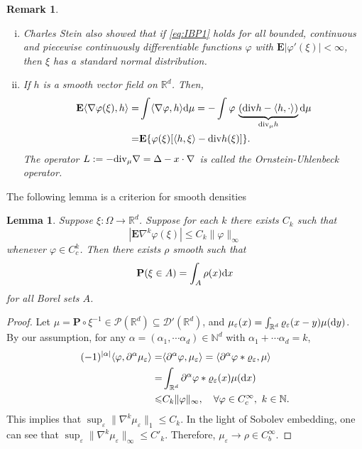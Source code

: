 \documentclass[twoside, 12pt]{book}
\numberwithin{equation}{chapter}
\newtheorem{lemma}[theorem]{Lemma}
\newtheorem{remark}[theorem]{Remark}
\def\mN{{\mathbb N}}
\def\mR{{\mathbb R}}
\def\bE{{\mathbf E}}
\def\bP{{\mathbf P}}
\def\sD{{\mathscr D}}
\def\sP{{\mathscr P}}
\def\<{\langle}
\def\>{\rangle}
\def\leq{\leqslant}
\def\d{\text{\rm{d}}}
\def\eps{\varepsilon}
\def\div{\mathord{{\rm div}}}
\begin{document}
    \begin{remark}
    	\begin{enumerate}[(i)]
    		\item Charles Stein also showed that if \eqref{eq:IBP1} holds for all bounded, continuous and piecewise continuously differentiable functions $\varphi$ with $\bE|\varphi'(\xi)|<\infty$, then $\xi$ has a standard normal distribution.
    		\item If $h$ is a smooth vector field on $\mR^d$. Then, 
    		\begin{equation}\label{eq:IBP2}
    			\begin{aligned}
    				\bE \< \nabla \varphi(\xi), h\> =& \int \<\nabla \varphi,h\>  \d \mu=-\int \varphi\,\underbrace{(\div h-\<h,\cdot\>)}_{\div_\mu h} \d \mu\\
    				=&\bE\{ \varphi(\xi) [\<h,\xi\>-\div h(\xi) ]\}. 
    			\end{aligned}
    		\end{equation}
    		The operator $L:=-\div_\mu \nabla=\Delta-x\cdot\nabla$ is called the Ornstein-Uhlenbeck operator. 
    	\end{enumerate}
    \end{remark}

    The following lemma is a criterion for smooth densities 
    \begin{lemma}
        Suppose $\xi: \Omega \rightarrow \mathbb{R}^d$. Suppose for each $k$ there exists $C_k$ such that
        $$
         \left|\mathbf{E}\nabla^k \varphi(\xi)\right| \leq C_k\|\varphi\|_{\infty}
        $$
        whenever $\varphi \in C^k_c$. Then there exists $\rho$ smooth such that
        $$
        \mathbf{P}(\xi \in A)=\int_A \rho(x) \d x
        $$
        for all Borel sets $A$.
    \end{lemma}
    \begin{proof}
        Let $\mu=\bP\circ \xi^{-1}\in \sP(\mR^d)\subseteq\sD'(\mR^d)$, and $\mu_\eps(x)=\int_{\mR^d}\varrho_\eps(x-y)\mu(\d y)$. By our assumption, for any $\alpha=(\alpha_1,\cdots\alpha_d)\in \mN^d$ with $\alpha_1+\cdots\alpha_d=k$, 
        \[
        \begin{aligned}
            (-1)^{|\alpha|}\<\varphi, \partial^\alpha\mu_\eps\>=&\<\partial^\alpha \varphi, \mu_\eps\>=\<\partial^\alpha \varphi*\varrho_\eps, \mu\>\\
            =&\int_{\mR^d}\partial^\alpha \varphi*\varrho_\eps(x) \mu(\d x)\\
            \leq& C_k\|\varphi\|_\infty, \quad \forall \varphi\in C_c^\infty,~ k\in \mN.
        \end{aligned}
        \]
         This implies that $\sup_{\eps} \|\nabla^k\mu_\eps\|_1\leq C_k$. In the light of Sobolev embedding, one can see that $\sup_{\eps}\|\nabla^k\mu_\eps\|_\infty\leq C'_k$. Therefore, $\mu_\eps\to \rho\in C_b^\infty$. 
    \end{proof}
\end{document}

